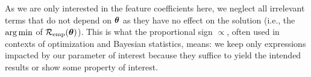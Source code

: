 \documentclass[a4paper]{article}
\begin{document}
{\begin{enumerate}[a)]
  As we are only interested in the feature coefficients here, we neglect all 
  irrelevant terms that do not depend on $\bm{\theta}$ as they have no effect on
  the solution (i.e., the $\operatorname{arg\,min}$ of $\mathcal{R}_{\text{emp}}(\bm{\theta})$).
  This is what the proportional sign $\propto$, often used in 
  contexts of optimization and Bayesian statistics, means: we keep 
  only expressions impacted by our parameter of interest because they suffice 
  to yield the intended results or show some property of interest.
  
  
  

\end{enumerate}
}
\end{document}
